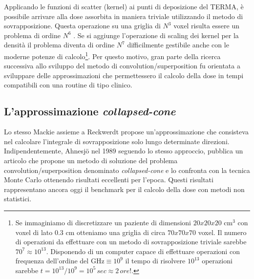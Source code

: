 {Applicando le funzioni di scatter (kernel) ai punti di deposizione del TERMA, è possibile arrivare alla dose assorbita in maniera triviale utilizzando il metodo di sovrapposizione. Questa operazione su una griglia di $N^3$ voxel risulta essere un problema  di ordine $N^6$ \cite{Ahnesjo1999}. Se si aggiunge l'operazione di scaling dei kernel per la densità il problema diventa di ordine $N^7$ difficilmente gestibile anche con le moderne potenze di calcolo\footnote{Se immaginiamo di discretizzare un paziente di dimensioni $20x20x20$ cm$^3$ con voxel di lato $0.3$ cm otteniamo una griglia di circa $70x70x70$ voxel. Il numero di operazioni da effettuare con un metodo di sovrapposizione triviale sarebbe $70^7\approx 10^{13}$. Disponendo di un computer capace di effettuare operazioni con frequenza dell'ordine del GHz$\equiv 10^9$ il tempo di risolvere $10^{13}$ operazioni sarebbe $t=10^{13}/10^9=10^5\,sec\approx 2\, ore!$.}. Per questo motivo, gran parte della ricerca successiva allo sviluppo del metodo di convolution/superposition fu orientata a sviluppare delle approssimazioni che permettessero il calcolo della dose in tempi compatibili con una routine di tipo clinico.

\subsection{L'approssimazione \textit{collapsed-cone}}
Lo stesso Mackie assieme a Reckwerdt \cite{Reckwerdt1992} propose un'approssimazione che consisteva nel calcolare l'integrale di sovrapposizione solo lungo determinate direzioni. Indipendentemente, Ahnesj\"{o} nel 1989 seguendo lo stesso approccio, pubblica un articolo \cite{Ahnesjo1989} che propone un metodo di soluzione del problema convolution/superposition denominato \textit{collapsed-cone} e lo confronta con la tecnica Monte Carlo ottenendo risultati eccellenti per l'epoca. Questi risultati rappresentano ancora oggi il benchmark per il calcolo della dose con metodi non statistici.

}
